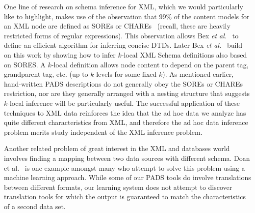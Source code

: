 One line of research on schema inference for XML, which we would
particularly like to highlight, makes use of the 
observation that 99\% of the content models for an XML node are defined as
SOREs or CHAREs~\cite{martens+:expressiveness-xml-schema} (recall, these
are heavily restricted forms of regular expressions).  
This observation allows Bex {\em et al.}~\cite{bex+:dtd-inference} to define
an efficient algorithm for inferring concise DTDs.  Later 
Bex {\em et al.}~\cite{bex+:inferring-xml-schema} build on this work 
by showing how to infer $k$-local XML Schema definitions also based on
SORES.  A $k$-local definition allows node content to depend on the parent
tag, grandparent tag, etc. (up to $k$ levels for some fixed $k$).
As mentioned earlier, hand-written PADS descriptions do not generally obey
the SOREs or CHAREs restriction, nor are they generally arranged with a nesting
structure that suggests $k$-local inference will be particularly useful.
The successful application of these techniques to XML data reinforces 
the idea that the ad hoc data we analyze has quite different characteristics
from XML, and therefore the ad hoc data inference problem merits study
independent of the XML inference problem.

Another related problem of great interest in the XML and databases world
involves finding a mapping between two data sources with different schema.
Doan et al.~\cite{doan+:disparate-data-sources} is one example amongst
many who attempt to solve this problem using a machine learning approach.
While some of our PADS tools do involve translations between
different formats, our learning system does not attempt to discover
translation tools for which the output is guaranteed to match 
the characteristics of a second data set.
